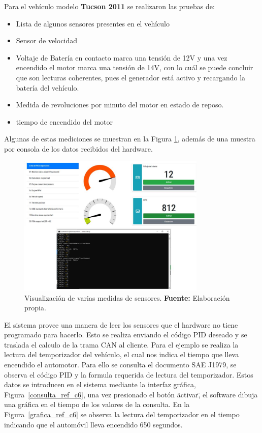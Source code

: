 Para el vehículo modelo \textbf{Tucson 2011} se realizaron las pruebas de: 


\begin{itemize}
    \item Lista de algunos sensores presentes en el vehículo
    \item Sensor de velocidad
    \item Voltaje de Batería en contacto marca una tensión de 12V y una vez encendido el motor marca una tensión de 14V, con lo cuál se puede concluir que son lecturas coherentes, pues el generador está activo y recargando la batería del vehículo. 
    \item Medida de revoluciones por minuto del motor en estado de reposo. 
    \item tiempo de encendido del motor
\end{itemize}

Algunas de estas  mediciones se muestran en la Figura \ref{dash_ref_c6}, además de una muestra por consola de los datos recibidos del hardware. 

\begin{figure}[H]
	\centering
	\includegraphics[width=0.8\textwidth]{./Cap6imagen/dash_fig_c6.jpg}
	\caption [Visualización de varias medidas de sensores.]{Visualización de varias medidas de sensores.  \textbf{ Fuente:} %
		Elaboración propia.}
	\label{dash_ref_c6} %
\end{figure}


El sistema provee una manera de leer los sensores que el hardware no tiene programado para hacerlo. 
Esto se realiza enviando el código PID deseado y  se traslada el calculo de la trama CAN al cliente. 
Para el ejemplo se realiza la lectura del temporizador del vehículo, el cual nos indica el tiempo que lleva encendido el automotor. 
Para ello se consulta el documento SAE J1979, se observa el código PID y la formula requerida de lectura del temporizador. 
Estos datos se introducen en el sistema mediante la interfaz gráfica, Figura~\ref{consulta_ref_c6}, una vez presionado el botón \"activar\", el software dibuja  una gráfica en el tiempo de los valores de la consulta. 
En la Figura~\ref{grafica_ref_c6} se observa la lectura del temporizador en el tiempo indicando que el automóvil lleva encendido 650 segundos. 

